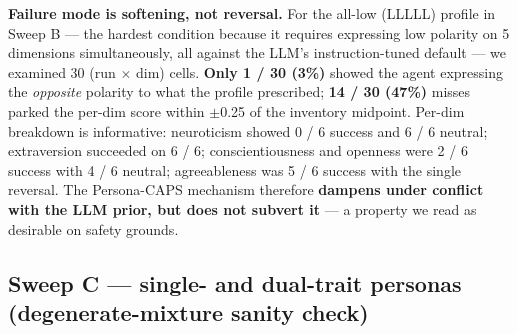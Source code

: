 \begin{table}[t]
\centering
{}
\caption{Sweep B cross-vendor extension at $k_\text{per dim} = 3$ on five subjects (MiniMax, Gemini-2.5-Flash, three locally-served Qwen variants). Direction-match rate averaged over 7 profiles $\times$ 2 retrieval modes; failure mode is dampening, not reversal.}
\label{tab:joint-xvendor}
\end{table}

\textbf{Failure mode is softening, not reversal.} For the all-low (LLLLL) profile in Sweep B --- the hardest condition because it requires expressing low polarity on 5 dimensions simultaneously, all against the LLM's instruction-tuned default --- we examined 30 (run $\times$ dim) cells. \textbf{Only 1 / 30 (3\%)} showed the agent expressing the \textit{opposite} polarity to what the profile prescribed; \textbf{14 / 30 (47\%)} misses parked the per-dim score within $\pm$0.25 of the inventory midpoint. Per-dim breakdown is informative: neuroticism showed 0 / 6 success and 6 / 6 neutral; extraversion succeeded on 6 / 6; conscientiousness and openness were 2 / 6 success with 4 / 6 neutral; agreeableness was 5 / 6 success with the single reversal. The Persona-CAPS mechanism therefore \textbf{dampens under conflict with the LLM prior, but does not subvert it} --- a property we read as desirable on safety grounds.

\subsection{Sweep C --- single- and dual-trait personas (degenerate-mixture sanity check)}
\label{app:C.3}

